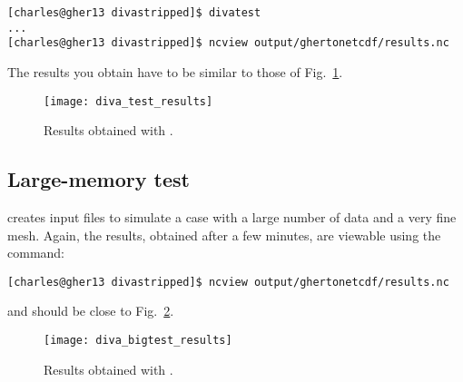 \begin{lstlisting}[style=Bash]
[charles@gher13 divastripped]$ divatest
...
[charles@gher13 divastripped]$ ncview output/ghertonetcdf/results.nc
\end{lstlisting}
The results you obtain have to be similar to those of Fig.~\ref{fig:diva_test_results}.

\begin{figure}[H]
\centering 
\texttt{[image: diva\_test\_results]}
\caption{Results obtained with .\label{fig:diva_test_results}}
\end{figure}

\subsection{Large-memory test}

 creates input files to simulate a case with a large number of data and a very fine mesh. Again, the results, obtained after a few minutes, are viewable using the command:
\begin{lstlisting}[style=Bash]
[charles@gher13 divastripped]$ ncview output/ghertonetcdf/results.nc
\end{lstlisting}
and should be close to Fig.~\ref{fig:diva_bigtest_results}.

\begin{figure}[H]
\centering 
\texttt{[image: diva\_bigtest\_results]}
\caption{Results obtained with .\label{fig:diva_bigtest_results}}
\end{figure}



